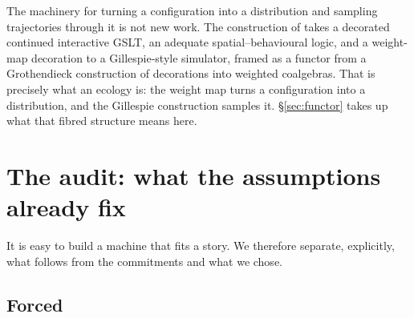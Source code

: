 \documentclass[11pt]{article}
\theoremstyle{plain}
\theoremstyle{definition}
\begin{document}
The machinery for turning a configuration into a distribution and sampling trajectories through it is
not new work. The construction of \cite{StochSim} takes a decorated continued interactive GSLT, an
adequate spatial--behavioural logic, and a weight-map decoration to a Gillespie-style simulator,
framed as a functor from a Grothendieck construction of decorations into weighted coalgebras. That is
precisely what an ecology is: the weight map turns a configuration into a distribution, and the
Gillespie construction samples it. \S\ref{sec:functor} takes up what that fibred structure means here.

\section{The audit: what the assumptions already fix}
\label{sec:audit}

It is easy to build a machine that fits a story. We therefore separate, explicitly, what follows from
the commitments and what we chose.

\subsection{Forced}
\end{document}
